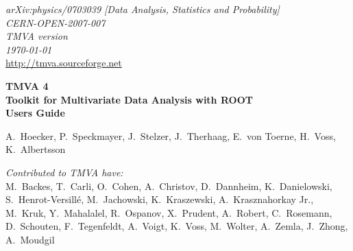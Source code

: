 \vspace{-1cm}
\begin{flushright}
{\sf\em arXiv:physics/0703039 [Data Analysis, Statistics and Probability]} \\
{\sf\em CERN-OPEN-2007-007} \\
{\sf\em TMVA version \TMVAVersion} \\
{\sf\em \today} \\
\def\UrlFont{\sf\em}
\url{http://tmva.sourceforge.net} 
\end{flushright}
\def\UrlFont{\rm}

\def\miniPageOffset{0.2cm}
\def\miniPageWidth{13.5cm}
\HRule
\begin{flushleft}
\hspace{\miniPageOffset}\begin{minipage}{\miniPageWidth}
{\sf\Huge\bfseries\boldmath TMVA 4} \\[0.2cm]
{\sf\Large\bfseries\boldmath Toolkit for Multivariate Data Analysis with ROOT} \\[1cm]
{\sf\Huge\bfseries\boldmath Users Guide} 
\end{minipage}
\end{flushleft}
\HRule
\vspace{2.0cm}
\begin{flushright}
{\sf\Large  A.~Hoecker, P.~Speckmayer, J.~Stelzer, J.~Therhaag, E.~von Toerne, H.~Voss, K.~Albertsson} 

\vspace{1.2cm}
{\sf\em\large Contributed to TMVA have:} \\[0.4cm]
{\sf\large 
M.~Backes,
T.~Carli,
O.~Cohen,
A.~Christov, 
D.~Dannheim,
K.~Danielowski,\\[0.1cm]
S.~Henrot-Versill\'e, 
M.~Jachowski, 
K.~Kraszewski,
A.~Krasznahorkay Jr.,  \\[0.1cm]    
M.~Kruk,
Y.~Mahalalel, 
R.~Ospanov, 
X.~Prudent, 
A.~Robert,
C.~Rosemann, \\[0.1cm]  
D.~Schouten, 
F.~Tegenfeldt,
A.~Voigt,
K.~Voss,
M.~Wolter, 
A.~Zemla,
J.~Zhong,
A.~Moudgil
}

\end{flushright}


